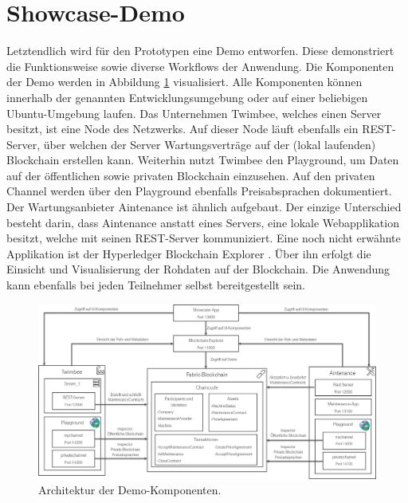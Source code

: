 \section{Showcase-Demo}
Letztendlich wird für den Prototypen eine Demo entworfen. Diese demonstriert die Funktionsweise sowie diverse Workflows der Anwendung. Die Komponenten der Demo werden in Abbildung \ref{fig:architecture-showcase} visualisiert. Alle Komponenten können innerhalb der genannten Entwicklungsumgebung oder auf einer beliebigen Ubuntu-Umgebung laufen. Das Unternehmen Twimbee, welches einen Server besitzt, ist eine Node des Netzwerks. Auf dieser Node läuft ebenfalls ein REST-Server, über welchen der Server Wartungsverträge auf der (lokal laufenden) Blockchain erstellen kann. Weiterhin nutzt Twimbee den Playground, um Daten auf der öffentlichen sowie privaten Blockchain einzusehen. Auf den privaten Channel werden über den Playground ebenfalls Preisabsprachen dokumentiert. Der Wartungsanbieter Aintenance ist ähnlich aufgebaut. Der einzige Unterschied besteht darin, dass Aintenance anstatt eines Servers, eine lokale Webapplikation besitzt, welche mit seinen REST-Server kommuniziert. Eine noch nicht erwähnte Applikation ist der Hyperledger Blockchain Explorer \cite{HyperledgerBlockchainExplorerTeamHyperledgerBlockchainExplorer2018}. Über ihn erfolgt die Einsicht und Visualisierung der Rohdaten auf der Blockchain. Die Anwendung kann ebenfalls bei jeden Teilnehmer selbst bereitgestellt sein.

\begin{figure}[!htbp]
    \centering
      \includegraphics[width=1.0\textwidth,angle=0]{images/architecture_showcase}
       \caption{Architektur der Demo-Komponenten.}
      \label{fig:architecture-showcase}
\end{figure}

